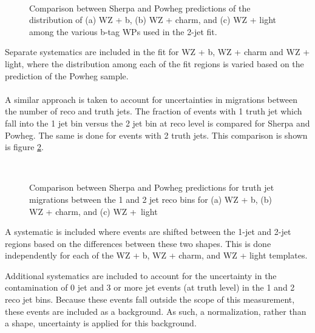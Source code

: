 \begin{figure}[H]
    \centering
    \\                           
    \caption{Comparison between Sherpa and Powheg predictions of the distribution of (a) WZ + b, (b) WZ + charm, and (c) WZ + light among the various b-tag WPs used in the 2-jet fit.}
\label{fig:powheg2j}
\end{figure}

Separate systematics are included in the fit for WZ + b, WZ + charm and WZ + light, where the distribution among each of the fit regions is varied based on the prediction of the Powheg sample.

\paragraph{}
A similar approach is taken to account for uncertainties in migrations between the number of reco and truth jets. The fraction of events with 1 truth jet which fall into the 1 jet bin versus the 2 jet bin at reco level is compared for Sherpa and Powheg. The same is done for events with 2 truth jets. This comparison is shown is figure \ref{fig:migration12}.

\begin{figure}[H]
    \centering
    \\    
    \caption{Comparison between Sherpa and Powheg predictions for truth jet migrations between the 1 and 2 jet reco bins for (a) WZ + b, (b) WZ + charm, and (c) WZ +\ light}
\label{fig:migration12}
\end{figure}

A systematic is included where events are shifted between the 1-jet and 2-jet regions based on the differences between these two shapes. This is done independently for each of the WZ + b, WZ + charm, and WZ + light templates.

Additional systematics are included to account for the uncertainty in the contamination of 0 jet and 3 or more jet events (at truth level) in the 1 and 2 reco jet bins. Because these events fall outside the scope of this measurement, these events are included as a background. As such, a normalization, rather than a shape, uncertainty is applied for this background.

